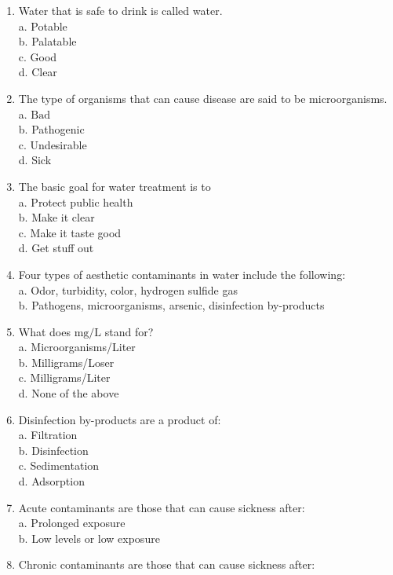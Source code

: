 \begin{enumerate}
\item Water that is safe to drink is called water.\\
a. Potable\\
b. Palatable\\
c. Good\\
d. Clear\\
\item The type of organisms that can cause disease are said to be microorganisms.\\
a. $\mathrm{Bad}$\\
b. Pathogenic\\
c. Undesirable\\
d. Sick\\
\item The basic goal for water treatment is to\\
a. Protect public health\\
b. Make it clear\\
c. Make it taste good\\
d. Get stuff out\\
\item Four types of aesthetic contaminants in water include the following:\\
a. Odor, turbidity, color, hydrogen sulfide gas\\
b. Pathogens, microorganisms, arsenic, disinfection by-products\\
\item What does $\mathrm{mg} / \mathrm{L}$ stand for?\\
a. Microorganisms/Liter\\
b. Milligrams/Loser\\
c. Milligrams/Liter\\
d. None of the above\\
\item Disinfection by-products are a product of:\\
a. Filtration\\
b. Disinfection\\
c. Sedimentation\\
d. Adsorption\\
\item Acute contaminants are those that can cause sickness after:\\
a. Prolonged exposure\\
b. Low levels or low exposure\\
\item Chronic contaminants are those that can cause sickness after:\\

\end{enumerate}
